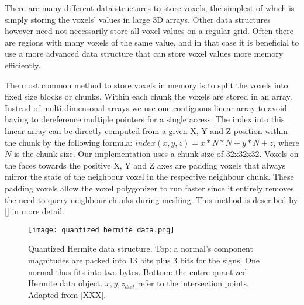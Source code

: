 There are many different data structures to store voxels, the simplest of which is simply storing the voxels' values in large 3D arrays.
Other data structures however need not necessarily store all voxel values on a regular grid. Often there are regions with many voxels of the same value, and
in that case it is beneficial to use a more advanced data structure that can store voxel values more memory efficiently.

The most common method to store voxels in memory is to split the voxels into fixed size blocks or chunks. Within each chunk the voxels are stored in an array. Instead of multi-dimensonal arrays we
use one contiguous linear array to avoid having to dereference multiple pointers for a single access. The index into this linear array can be directly computed from a given X, Y and Z position within the chunk by
the following formula: $index(x, y, z) = x * N * N + y * N + z$, where $N$ is the chunk size.
Our implementation uses a chunk size of 32x32x32. Voxels on the faces towards the positive X, Y and Z axes are padding voxels that always mirror the state of the neighbour voxel in the respective neighbour chunk.
These padding voxels allow the voxel polygonizer to run faster since it entirely removes the need to query neighbour chunks during meshing. This method is described by [] in more detail. \\

\begin{wrapfigure}{R}{0.6\textwidth}
\texttt{[image: quantized\_hermite\_data.png]}
\caption{Quantized Hermite data structure. Top: a normal's component magnitudes are packed into 13 bits plus 3 bits for the signs. One normal thus fits into two bytes. Bottom: the entire quantized Hermite data object. $x,y,z_{dist}$ refer to the intersection points. Adapted from [XXX].}
\label{fig:quantized_hermite_data}
\end{wrapfigure}

